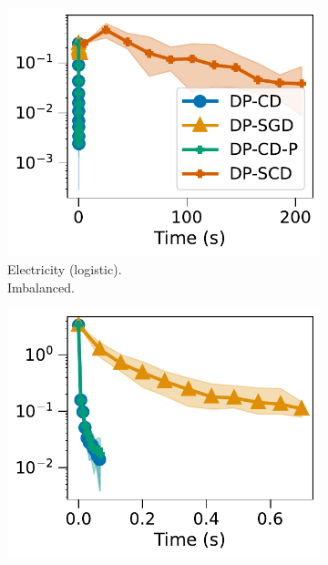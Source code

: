 \begin{figure}[t]
\begin{subfigure}{0.045\linewidth}
    \begin{minipage}{.1cm}
      \vfill
    \end{minipage}
  \end{subfigure}%
  \begin{subfigure}{0.3\linewidth}
    \centering
    \includegraphics[width=\linewidth]{plots/time_optimization_electricity_raw.pdf}
    \caption{Electricity (logistic).\\ Imbalanced.}
    \label{fig:expe-time-electricity-raw}
  \end{subfigure}%
  \begin{subfigure}{0.3\linewidth}
    \centering
    \includegraphics[width=\linewidth]{plots/time_optimization_california_raw.pdf}

\end{subfigure}
\end{figure}
